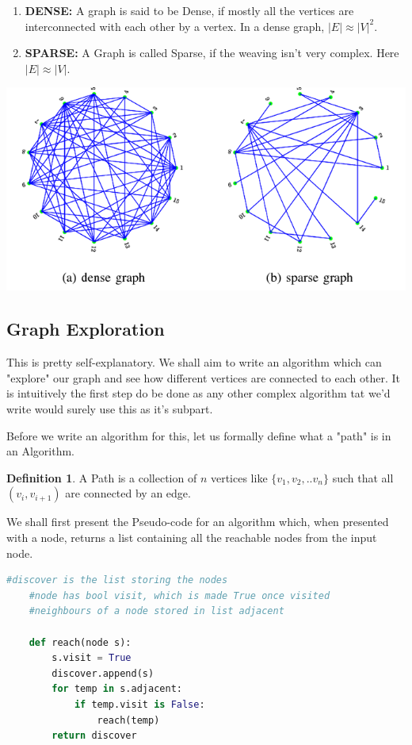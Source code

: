 \documentclass{article}
\theoremstyle{definition}
\newtheorem*{definition}{Definition}
\theoremstyle{example}
\begin{document}
\begin{enumerate}
    \item \textbf{DENSE: } A graph is said to be Dense, if mostly all the vertices are interconnected with each other by a vertex. In a dense graph, $|E|\approx |V|^2$.
    \item \textbf{SPARSE: } A Graph is called Sparse, if the weaving isn't very complex. Here $|E|\approx |V|$.
\end{enumerate}
\vspace{9mm}
\begin{center}
    \includegraphics[scale = 0.6]{yeehaw.png}
\end{center}
\newpage

\subsection{\Large Graph Exploration}
\hspace{4mm} This is pretty self-explanatory. We shall aim to write an algorithm which can "explore" our graph and see how different vertices are connected to each other. It is intuitively the first step do be done as any other complex algorithm tat we'd write would surely use this as it's subpart.\par
\vspace{4mm}
Before we write an algorithm for this, let us formally define what a "path" is in an Algorithm.
\theoremstyle{definition}
\begin{definition}
    A Path is a collection of $n$ vertices like $\{v_1, v_2, .. v_n\}$ such that all $(v_i, v_{i+1})$ are connected by an edge.
\end{definition}
\vspace{3mm}
We shall first present the Pseudo-code for an algorithm which, when presented with a node, returns a list containing all the reachable nodes from the input node.\par
\vspace{3mm}
\begin{lstlisting}[language = python, basicstyle = \Large]
    #discover is the list storing the nodes
    #node has bool visit, which is made True once visited
    #neighbours of a node stored in list adjacent
    
    def reach(node s):
        s.visit = True
        discover.append(s)
        for temp in s.adjacent:
            if temp.visit is False:
                reach(temp)
        return discover
\end{lstlisting}
\end{document}
